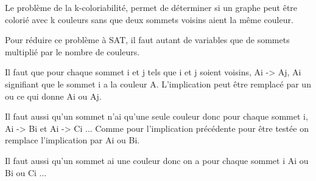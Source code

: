Le problème de la k-coloriabilité, permet de déterminer si un graphe
peut être colorié avec k couleurs sans que deux sommets voisins aient
la même couleur.

Pour réduire ce problème à SAT, il faut autant de variables que de
sommets multiplié par le nombre de couleurs. 

Il faut que pour chaque sommet i et j tels que i et j soient voisins,
Ai -> \neg Aj, Ai signifiant que le sommet i a la couleur A. L'implication
peut être remplacé par un ou ce qui donne \neg Ai ou \neg Aj. 

Il faut aussi qu'un sommet n'ai qu'une seule couleur donc pour chaque
sommet i, Ai -> \neg Bi et  Ai -> \neg Ci ... Comme pour l'implication
précédente pour être testée on remplace l'implication par \neg Ai ou Bi.

Il faut aussi qu'un sommet ai une couleur donc on a pour chaque sommet
i Ai ou Bi ou Ci ...
